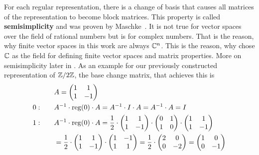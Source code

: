 For each regular representation, there is a change of basis that causes all matrices of the representation to become block matrices.
This property is called \textbf{semisimplicity} and was proven by Maschke~\cite{maschke1899}.
It is not true for vector spaces over the field of rational numbers but is for complex numbers.
That is the reason, why finite vector spaces in this work are always $\mathbb{C}^n$.
This is the reason, why chose $\mathbb{C}$ as the field for defining finite vector spaces and matrix properties.
More on semisimplicity later in .
As an example for our previously constructed representation of $\mathbb{Z}/2\mathbb{Z}$, the base change matrix, that achieves this is
\begin{align*}
    & A = \begin{pmatrix}
        1 & 1 \\
        1 & -1
    \end{pmatrix} \\
    0: \qquad & A^{-1} \cdot \operatorname{reg}(0) \cdot A = A^{-1} \cdot I \cdot A = A^{-1} \cdot A = I \\
    1: \qquad & A^{-1} \cdot \operatorname{reg}(0) \cdot A = \frac{1}{2} \cdot \begin{pmatrix}
        1 & 1 \\
        1 & -1
    \end{pmatrix} \cdot \begin{pmatrix}
        0 & 1 \\
        1 & 0
    \end{pmatrix} \cdot \begin{pmatrix}
        1 & 1 \\
        1 & -1
    \end{pmatrix} \\
    & = \frac{1}{2} \cdot \begin{pmatrix}
        1 & 1 \\
        1 & -1
    \end{pmatrix} \cdot \begin{pmatrix}
        1 & -1 \\
        1 & 1
    \end{pmatrix} = \frac{1}{2} \cdot \begin{pmatrix}
        2 & 0 \\
        0 & -2
    \end{pmatrix} = \begin{pmatrix}
        1 & 0 \\
        0 & -1
    \end{pmatrix}
\end{align*}
